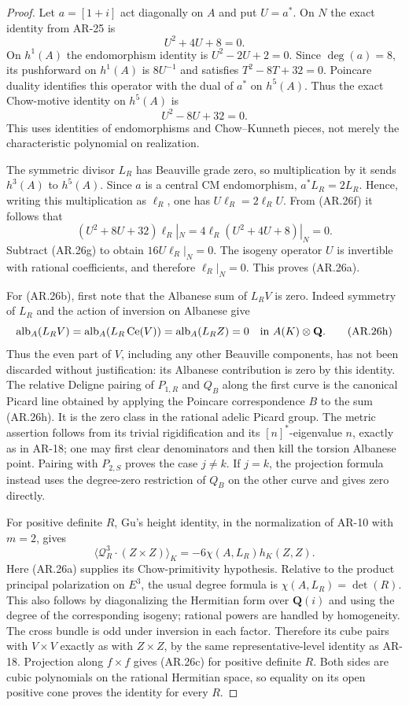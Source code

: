 \begin{proof}
Let $a=[1+i]$ act diagonally on $A$ and put $U=a^*$.  On $N$ the
exact identity from AR-25 is
\[
 U^2+4U+8=0.                                             \tag{AR.26f}
\]
On $h^1(A)$ the endomorphism identity is $U^2-2U+2=0$.
Since $\deg(a)=8$, its pushforward on $h^1(A)$ is $8U^{-1}$ and
satisfies $T^2-8T+32=0$.  Poincare duality identifies this operator
with the dual of $a^*$ on $h^5(A)$.  Thus the exact Chow-motive
identity on $h^5(A)$ is
\[
 U^2-8U+32=0.                                            \tag{AR.26g}
\]
This uses identities of endomorphisms and Chow--Kunneth pieces,
not merely the characteristic polynomial on realization.

The symmetric divisor $L_R$ has Beauville grade zero, so multiplication
by it sends $h^3(A)$ to $h^5(A)$.  Since $a$ is a central CM
endomorphism, $a^*L_R=2L_R$.  Hence, writing this multiplication as
$\ell_R$, one has $U\ell_R=2\ell_RU$.  From (AR.26f) it follows that
\[
 (U^2+8U+32)\ell_R|_N
 =4\ell_R(U^2+4U+8)|_N=0.
\]
Subtract (AR.26g) to obtain $16U\ell_R|_N=0$.
The isogeny operator $U$ is invertible with rational coefficients,
and therefore $\ell_R|_N=0$.  This proves (AR.26a).

For (AR.26b), first note that the Albanese sum of $L_RV$ is zero.
Indeed symmetry of $L_R$ and the action of inversion on Albanese
give
\[
 \operatorname{alb}_A(L_RV)
 =\operatorname{alb}_A(L_R\operatorname{Ce}(V))
 =\operatorname{alb}_A(L_RZ)=0
 \quad\hbox{in }A(K)\otimes\mathbf Q.                   \tag{AR.26h}
\]
Thus the even part of $V$, including any other Beauville components,
has not been discarded without justification: its Albanese
contribution is zero by this identity.  The relative Deligne pairing
of $P_{1,R}$ and $Q_B$ along the first curve is the canonical
Picard line obtained by applying the Poincare correspondence $B$ to
the sum (AR.26h).  It is the zero class in the rational adelic Picard
group.  The metric assertion follows from its trivial rigidification
and its $[n]^*$-eigenvalue $n$, exactly as in AR-18; one may first
clear denominators and then kill the torsion Albanese point.
Pairing with $P_{2,S}$ proves the case $j\ne k$.
If $j=k$, the projection formula instead uses the degree-zero
restriction of $Q_B$ on the other curve and gives zero directly.

For positive definite $R$, Gu's height identity, in the normalization
of AR-10 with $m=2$, gives
\[
 \langle\mathcal Q_R^3\cdot(Z\times Z)\rangle_K
       =-6\chi(A,L_R)h_K(Z,Z).
\]
Here (AR.26a) supplies its Chow-primitivity hypothesis.  Relative to
the product principal polarization on $E^3$, the usual degree formula
is $\chi(A,L_R)=\det(R)$.  This also follows by diagonalizing the
Hermitian form over $\mathbf Q(i)$ and using the degree of the
corresponding isogeny; rational powers are handled by homogeneity.
The cross bundle is odd under inversion in each factor.  Therefore
its cube pairs with $V\times V$ exactly as with $Z\times Z$, by the
same representative-level identity as AR-18.  Projection along
$f\times f$ gives (AR.26c) for positive definite $R$.  Both sides
are cubic polynomials on the rational Hermitian space, so equality
on its open positive cone proves the identity for every $R$.


\end{proof}
